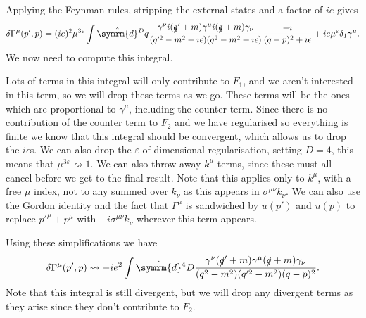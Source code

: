 \documentclass[fleqn]{NotesClass}
\newcommand{\diracadjoint}[1]{\overbar{#1}}
\newcommand{\dhat}[1]{\hat{\symrm{d}}{#1}}
\begin{document}
    Applying the Feynman rules, stripping the external states and a factor of \(ie\) gives
    \begin{equation}
        \delta\Gamma^\mu(p', p) = (ie)^2\mu^{3\varepsilon} \int \dhat{^Dq} \frac{\gamma^\nu i(\slashed{q}' + m)\gamma^\mu i(\slashed{q} + m)\gamma_\nu}{(q'^2 - m^2 + i\epsilon)(q^2 - m^2 + i\epsilon)} \frac{-i}{(q - p)^2 + i\epsilon} + ie\mu^\varepsilon \delta_1 \gamma^\mu.
    \end{equation}
    We now need to compute this integral.
    
    Lots of terms in this integral will only contribute to \(F_1\), and we aren't interested in this term, so we will drop these terms as we go.
    These terms will be the ones which are proportional to \(\gamma^\mu\), including the counter term.
    Since there is no contribution of the counter term to \(F_2\) and we have regularised so everything is finite we know that this integral should be convergent, which allows us to drop the \(i\epsilon\)s.
    We can also drop the \(\varepsilon\) of dimensional regularisation, setting \(D = 4\), this means that \(\mu^{3\varepsilon} \rightsquigarrow 1\).
    We can also throw away \(k^\mu\) terms, since these must all cancel before we get to the final result.
    Note that this applies only to \(k^\mu\), with a free \(\mu\) index, not to any summed over \(k_\nu\) as this appears in \(\sigma^{\mu\nu}k_\nu\).
    We can also use the Gordon identity and the fact that \(\Gamma^\mu\) is sandwiched by \(\diracadjoint{u}(p')\) and \(u(p)\) to replace \(p'^\mu + p^\mu\) with \(-i\sigma^{\mu\nu}k_\nu\) wherever this term appears.
    
    Using these simplifications we have
    \begin{equation}\label{eqn:delta gamma}
        \delta\Gamma^\mu(p', p) \rightsquigarrow -ie^2 \int \dhat{^4D} \frac{\gamma^\nu(\slashed{q}' + m)\gamma^\mu(\slashed{q} + m)\gamma_\nu}{(q^2 - m^2)(q'^2 - m^2)(q - p)^2}.
    \end{equation}
    Note that this integral is still divergent, but we will drop any divergent terms as they arise since they don't contribute to \(F_2\).
    
\end{document}
